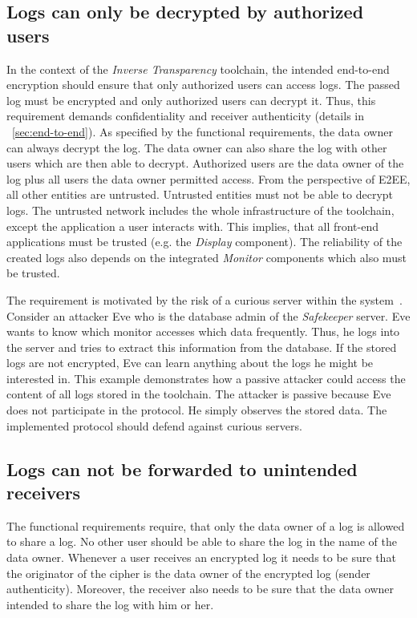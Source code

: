 \documentclass[../main.tex]{subfiles}
\begin{document}
\subsection{Logs can only be decrypted by authorized users}
In the context of the \emph{Inverse Transparency} toolchain, the intended end-to-end encryption should ensure that only authorized users can access logs.
The passed log must be encrypted and only authorized users can decrypt it.
Thus, this requirement demands confidentiality and receiver authenticity (details in ~\cref{sec:end-to-end}).
As specified by the functional requirements, the data owner can always decrypt the log.
The data owner can also share the log with other users which are then able to decrypt.
Authorized users are the data owner of the log plus all users the data owner permitted access.
From the perspective of E2EE, all other entities are untrusted.
Untrusted entities must not be able to decrypt logs.
The untrusted network includes the whole infrastructure of the toolchain, except the application a user interacts with.
This implies, that all front-end applications must be trusted (e.g. the \emph{Display} component).
The reliability of the created logs also depends on the integrated \emph{Monitor} components which also must be trusted.

The requirement is motivated by the risk of a curious server within the system~\cite{Nabeel2017}.
Consider an attacker Eve who is the database admin of the \emph{Safekeeper} server.
Eve wants to know which monitor accesses which data frequently.
Thus, he logs into the server and tries to extract this information from the database.
If the stored logs are not encrypted, Eve can learn anything about the logs he might be interested in.
This example demonstrates how a passive attacker could access the content of all logs stored in the toolchain.
The attacker is passive because Eve does not participate in the protocol.
He simply observes the stored data.
The implemented protocol should defend against curious servers.

\subsection{Logs can not be forwarded to unintended receivers}

The functional requirements require, that only the data owner of a log is allowed to share a log.
No other user should be able to share the log in the name of the data owner.
Whenever a user receives an encrypted log it needs to be sure that the originator of the cipher is the data owner of the encrypted log (sender authenticity).
Moreover, the receiver also needs to be sure that the data owner intended to share the log with him or her.
\end{document}
